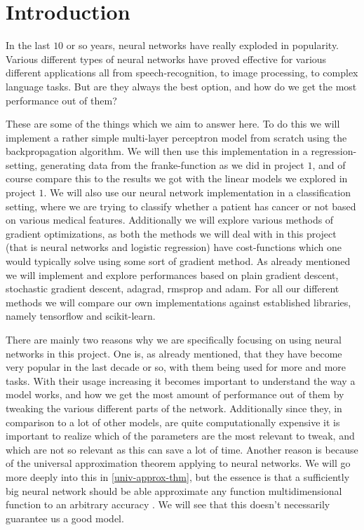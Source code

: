 \documentclass{article}
\begin{document}
\section{Introduction}
In the last $10$ or so years, neural networks have really exploded in
popularity. Various different types of neural networks have proved effective for
various different applications all from speech-recognition, to image processing,
to complex language tasks. But are they always the best option, and how do we
get the most performance out of them?

These are some of the things which we aim to answer here. To do this we will
implement a rather simple multi-layer perceptron model from scratch using the
backpropagation algorithm. We will then use this implementation in a
regression-setting, generating data from the franke-function as we did in
project $1$, and of course compare this to the results we got with the linear
models we explored in project $1$. We will also use our neural network
implementation in a classification setting, where we are trying to classify
whether a patient has cancer or not based on various medical features.
Additionally we will explore various methods of gradient optimizations, as both
the methods we will deal with in this project (that is neural networks and
logistic regression) have cost-functions which one would typically solve using
some sort of gradient method.  As already mentioned we will implement and
explore performances based on plain gradient descent, stochastic gradient
descent, adagrad, rmsprop and adam. For all our different methods we will
compare our own implementations against established libraries, namely tensorflow
and scikit-learn.

There are mainly two reasons why we are specifically focusing on using neural
networks in this project. One is, as already mentioned, that they have become
very popular in the last decade or so, with them being used for more and more
tasks. With their usage increasing it becomes important to understand the way a
model works, and how we get the most amount of performance out of them by
tweaking the various different parts of the network. Additionally since they, in
comparison to a lot of other models, are quite computationally expensive it is
important to realize which of the parameters are the most relevant to tweak, and
which are not so relevant as this can save a lot of time. Another reason is
because of the universal approximation theorem applying to neural networks. We
will go more deeply into this in \ref{univ-approx-thm}, but the essence is that
a sufficiently big neural network should be able approximate any function
multidimensional function to an arbitrary accuracy
\cite[s.~13.5]{lecutenotes13}. We will see that this doesn't necessarily
guarantee us a good model.
\end{document}
